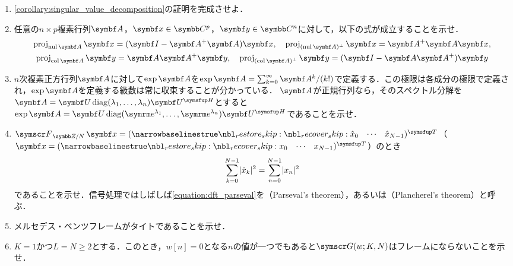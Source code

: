 \documentclass[../../main]{subfiles}
\begin{document}
\begin{enumerate}
  \item \cref{corollary:singular_value_decomposition}の証明を完成させよ．
  \item 任意の\(n\times p\)複素行列\(\mat{A}\)，\(\vect{x}\in\numset{C}^p\)，\(\vect{y}\in\numset{C}^n\)に対して，以下の式が成立することを示せ．
    \begin{gather*}
      \proj_{\nulsp\mat{A}}\vect{x} = (\imat-\pinv{\mat{A}}\mat{A})\vect{x},
      \quad\proj_{\pcomp{(\nulsp\mat{A})}}\vect{x} = \pinv{\mat{A}}\mat{A}\vect{x}, \\
      \proj_{\colsp\mat{A}}\vect{y} = \mat{A}\pinv{\mat{A}}\vect{y},
      \quad\proj_{\pcomp{(\colsp\mat{A})}}\vect{y} = (\imat-\mat{A}\pinv{\mat{A}})\vect{y}
    \end{gather*}
  \item \(n\)次複素正方行列\(\mat{A}\)に対して\(\exp\mat{A}\)を\(\exp\mat{A}=\sum_{k=0}^\infty\mat{A}^k/(k!)\)で定義する．この極限は各成分の極限で定義され，\(\exp\mat{A}\)を定義する級数は常に収束することが分かっている．
    \(\mat{A}\)が正規行列なら，そのスペクトル分解を\(\mat{A}=\mat{U}\diag(\lambda_1,\dots,\lambda_n)\htrps{\mat{U}}\)とすると\(\exp\mat{A}=\mat{U}\diag(\napr^{\lambda_1},\dots,\napr^{\lambda_n})\htrps{\mat{U}}\)であることを示せ．
  \item \(\dft{N}\vect{x}=\trps{\rowvect{\hat{x}_0 & \cdots & \hat{x}_{N-1}}}\)（\(\vect{x}=\trps{\rowvect{x_0 & \cdots & x_{N-1}}}\)）のとき
    \begin{equation}
      \label{equation:dft_parseval}
      \sum_{k=0}^{N-1}\lvert\hat{x}_k\rvert^2 = \sum_{n=0}^{N-1}\lvert x_n\rvert^2
    \end{equation}
    であることを示せ．信号処理ではしばしば\cref{equation:dft_parseval}を（Parseval's theorem），あるいは（Plancherel's theorem）と呼ぶ．  
  \item メルセデス・ベンツフレームがタイトであることを示せ．
  \item \(K=1\)かつ\(L=N\geq 2\)とする．このとき，\(w[n]=0\)となる\(n\)の値が一つでもあると\(\gaborsys{w}{K}{N}\)はフレームにならないことを示せ．
\end{enumerate}
\end{document}
